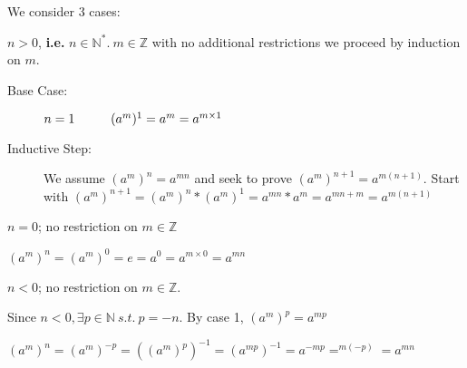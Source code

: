 \documentclass[10pt]{article}
\begin{document}
\begin{description}
		\begin{description}
			\item[Proof:] We consider 3 cases:
			\item[Case 1:] $n > 0$, \textbf{i.e.} $n \in \mathbb{N}^*. \: m \in \mathbb{Z}$ with no additional restrictions we proceed by induction on $m$.
			\begin{description}
				\item[Base Case:] $n=1 \hspace{10mm} (a^m)^1 = a^m = a^{m \times 1}$
				\item[Inductive Step:] We assume $(a^m)^n = a^{mn}$ and seek to prove $(a^m)^{n+1} = a^{m(n+1)}$. Start with $(a^m)^{n+1} = (a^m)^n * (a^m)^1 = a^{mn} * a^m = a^{mn+m} = a^{m(n+1)}$
			\end{description}
			\item[Case 2:] $n=0$; no restriction on $m \in \mathbb{Z}$
			\item $(a^m)^n = (a^m)^0 = e = a^0 = a^{m \times 0} = a^{mn}$
			\item[Case 3:] $n < 0$; no restriction on $m \in \mathbb{Z}$.
			\item Since $n < 0, \exists p \in \mathbb{N} \: s.t. \: p = -n$. By case 1, $(a^m)^p = a^{mp}$
			\item $(a^m)^n = (a^m)^{-p} = ((a^m)^p)^{-1} = (a^{mp})^{-1} = a^{-mp} = ^{m(-p)} = a^{mn}$
		\end{description}
	\end{description}
	
\end{document}
